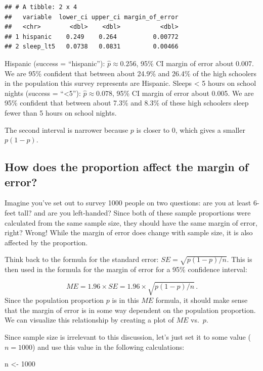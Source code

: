 \documentclass[
]{article}
\newenvironment{Shaded}{\begin{snugshade}}{\end{snugshade}}
\newcommand{\DecValTok}[1]{\textcolor[rgb]{0.00,0.00,0.81}{#1}}
\newcommand{\NormalTok}[1]{#1}
\newcommand{\OtherTok}[1]{\textcolor[rgb]{0.56,0.35,0.01}{#1}}
\begin{document}
\begin{verbatim}
## # A tibble: 2 x 4
##   variable  lower_ci upper_ci margin_of_error
##   <chr>        <dbl>    <dbl>           <dbl>
## 1 hispanic    0.249    0.264          0.00772
## 2 sleep_lt5   0.0738   0.0831         0.00466
\end{verbatim}

Hispanic (success = ``hispanic''): \(\hat{p} \approx 0.256\), 95\% CI
margin of error about 0.007. We are 95\% confident that between about
24.9\% and 26.4\% of the high schoolers in the population this survey
represents are Hispanic. Sleeps \textless{} 5 hours on school nights
(success = ``\textless5''): \(\hat{p} \approx 0.078\), 95\% CI margin of
error about 0.005. We are 95\% confident that between about 7.3\% and
8.3\% of these high schoolers sleep fewer than 5 hours on school nights.

The second interval is narrower because \(p\) is closer to 0, which
gives a smaller \(p(1-p)\).

\subsection{How does the proportion affect the margin of
error?}\label{how-does-the-proportion-affect-the-margin-of-error}

Imagine you've set out to survey 1000 people on two questions: are you
at least 6-feet tall? and are you left-handed? Since both of these
sample proportions were calculated from the same sample size, they
should have the same margin of error, right? Wrong! While the margin of
error does change with sample size, it is also affected by the
proportion.

Think back to the formula for the standard error:
\(SE = \sqrt{p(1-p)/n}\). This is then used in the formula for the
margin of error for a 95\% confidence interval:

\[ME = 1.96\times SE = 1.96\times\sqrt{p(1-p)/n} \,.\] Since the
population proportion \(p\) is in this \(ME\) formula, it should make
sense that the margin of error is in some way dependent on the
population proportion. We can visualize this relationship by creating a
plot of \(ME\) vs.~\(p\).

Since sample size is irrelevant to this discussion, let's just set it to
some value (\(n = 1000\)) and use this value in the following
calculations:

\begin{Shaded}
\begin{Highlighting}[]
\NormalTok{n }\OtherTok{\textless{}{-}} \DecValTok{1000}
\end{Highlighting}
\end{Shaded}
\end{document}
